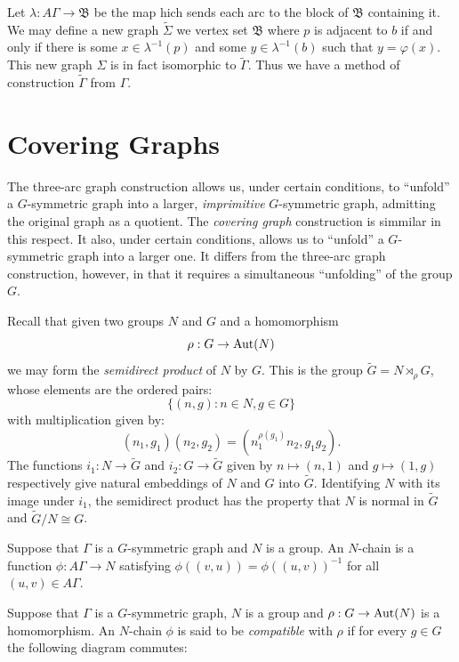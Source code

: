 Let $\lambda : A \Gamma \to \mathfrak{B}$ be the map hich sends
each arc to the block of $\mathfrak{B}$ containing it.
We may define a new graph $\widetilde{\Sigma}$ we vertex set
$\mathfrak{B}$ where $p$ is adjacent to $b$ if and only if
there is some $x \in \lambda^{-1}(p)$ and some $y \in \lambda^{-1}(b)$
such that $y = \varphi(x)$.
This new graph $\Sigma$ is in fact isomorphic to $\widetilde{\Gamma}$.
Thus we have a method of construction $\widetilde{\Gamma}$ from $\Gamma$.

\section{Covering Graphs}

The three-arc graph construction allows us, under certain conditions,
to ``unfold'' a $G$-symmetric graph into a larger, {\it imprimitive}
$G$-symmetric graph, admitting the original graph as a quotient.
The {\it covering graph} construction \cite{B1974} is simmilar
in this respect. It also, under certain conditions,
allows us to ``unfold'' a $G$-symmetric graph into a larger one.
It differs from the three-arc graph construction, however,
in that it requires a simultaneous ``unfolding''
of the group $G$.


Recall that given two groups $N$ and $G$ and a homomorphism
$$\rho : G \to \operatorname{Aut}(N)$$
we may form the {\it semidirect product} of $N$ by $G$.
This is the group $\widetilde{G} = N \rtimes_\rho G$,
whose elements are the ordered pairs:
$$\{ (n,g) : n \in N, g \in G \}$$
with multiplication given by:
$$(n_1, g_1)(n_2,g_2) = (n_1^{\rho(g_1)}n_2, g_1g_2).$$
The functions $i_1 : N \to \widetilde{G}$ and $i_2 : G \to \widetilde{G}$
given by $ n \mapsto (n,1) $ and $ g \mapsto (1,g) $ respectively give
natural embeddings of $N$ and $G$ into $\widetilde{G}$.
Identifying $N$ with its image under $i_1$,
the semidirect product has the property that $N$ is normal in $\widetilde{G}$
and $\widetilde{G}/N \cong G$.

\begin{definition} [$N$-chain]
Suppose that $\Gamma$ is a $G$-symmetric graph and $N$ is a group.
An $N$-chain is a function $\phi : A \Gamma \to N$
satisfying $\phi((v,u)) = \phi((u,v))^{-1}$ for all $(u,v) \in A \Gamma$.
\end{definition}

\begin{definition} 
Suppose that $\Gamma$ is a $G$-symmetric graph, $N$ is a group
and $\rho : G \to \operatorname{Aut}(N)$ is a homomorphism.
An $N$-chain $\phi$ is said to be {\it compatible} with $\rho$
if for every $g \in G$ the following diagram commutes:

\centerline{
}
\end{definition}

